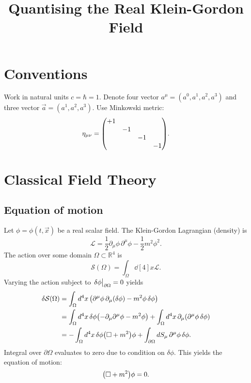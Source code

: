 \documentclass{article}
\title{Quantising the Real Klein-Gordon Field}
\date{}
\begin{document}
\maketitle
\tableofcontents
\section{Conventions}
Work in natural units $ c = \hbar = 1 $. Denote four vector $ a^{\mu} = (a^{0}, a^{1}, a^{2}, a^{3})  $ and three vector $ \vec{a} = (a^{1}, a^{2}, a^{3}) $. Use Minkowski metric:
\[
	\eta_{\mu \nu} = \mqty(\dmat{+1,-1,-1,-1}).
\]
\section{Classical Field Theory}
\subsection{Equation of motion}
Let $ \phi = \phi(t, \vec{x}) $ be a real scalar field. The Klein-Gordon Lagrangian (density) is
\begin{equation}
	\mathscr{L} = \frac{1}{2} \partial_{\mu} \phi \, \partial^{\mu} \phi - \frac{1}{2} m^{2} \phi^{2}.
\end{equation}
The action over some domain $ \Omega \subset \mathbb{R}^4 $ is
\begin{equation}
	\mathcal{S}(\Omega) = \int_{\Omega} \dd[4]{x} \mathscr{L}.
\end{equation}
Varying the action subject to $ \eval{\delta \phi}_{\partial \Omega} = 0 $ yields
\begin{align}
	\begin{split}
		\delta \mathcal{S}(\Omega) &= \int_\Omega \dd[4]{x} \qty(\partial^{\mu} \phi \, \partial_{\mu} (\delta \phi) - m^{2} \phi \, \delta \phi) \\
		&= \int_\Omega \dd[4]{x} \delta \phi \qty(-\partial_{\mu} \partial^{\mu} \phi - m^{2} \phi) + \int_\Omega \dd[4]{x} \partial_{\mu} \qty( \partial^{\mu} \phi \, \delta \phi) \\
		&= -\int_\Omega \dd[4]{x} \delta \phi \qty(\Box + m^{2}) \phi + \int_{\partial \Omega} \dd{S_{\mu}} \partial^{\mu} \phi \, \delta \phi.
	\end{split}
\end{align}
Integral over $ \partial \Omega $ evaluates to zero due to condition on $ \delta \phi $. This yields the equation of motion:
\begin{equation}
	\qty(\Box + m^{2}) \phi = 0.
\end{equation}
\end{document}

